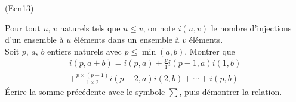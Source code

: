 \begin{tiny}(Een13)\end{tiny} Pour tout $u$, $v$ naturels tels que $u\leq v$, on note $i(u,v)$ le nombre d'injections d'un ensemble à $u$ éléments dans un ensemble à $v$ éléments.\\
Soit $p$, $a$, $b$ entiers naturels avec $p\leq \min(a, b)$. Montrer que 
\begin{multline*}
 i(p,a+b) = i(p,a) + \frac{p}{1}i(p-1,a)i(1,b) \\
+ \frac{p\times(p-1)}{1\times 2}i(p-2,a)i(2,b) + \cdots 
+ i(p,b) 
\end{multline*}
\'Ecrire la somme précédente avec le symbole $\sum$, puis démontrer la relation.